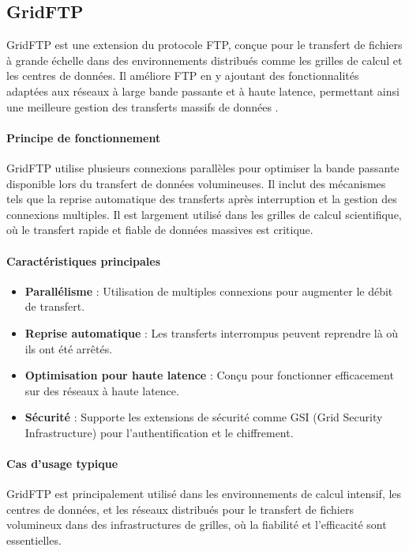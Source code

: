 \subsection{GridFTP}
GridFTP\cite{nadig2018comparative} est une extension du protocole FTP, conçue pour le transfert de fichiers à grande échelle dans des environnements distribués comme les grilles de calcul et les centres de données. Il améliore FTP en y ajoutant des fonctionnalités adaptées aux réseaux à large bande passante et à haute latence\cite{wikipedia-contributors-2023-gridftp, gridFTP}, permettant ainsi une meilleure gestion des transferts massifs de données .

\paragraph{Principe de fonctionnement}
GridFTP utilise plusieurs connexions parallèles pour optimiser la bande passante disponible lors du transfert de données volumineuses. Il inclut des mécanismes tels que la reprise automatique des transferts après interruption et la gestion des connexions multiples. Il est largement utilisé dans les grilles de calcul scientifique, où le transfert rapide et fiable de données massives est critique\cite{gridFTP}.

\paragraph{Caractéristiques principales} \begin{itemize} \item \textbf{Parallélisme} : Utilisation de multiples connexions pour augmenter le débit de transfert. \item \textbf{Reprise automatique} : Les transferts interrompus peuvent reprendre là où ils ont été arrêtés. \item \textbf{Optimisation pour haute latence} : Conçu pour fonctionner efficacement sur des réseaux à haute latence. \item \textbf{Sécurité} : Supporte les extensions de sécurité comme GSI (Grid Security Infrastructure) pour l'authentification et le chiffrement. \end{itemize}

\paragraph{Cas d'usage typique}
GridFTP est principalement utilisé dans les environnements de calcul intensif, les centres de données, et les réseaux distribués pour le transfert de fichiers volumineux dans des infrastructures de grilles, où la fiabilité et l'efficacité sont essentielles.

